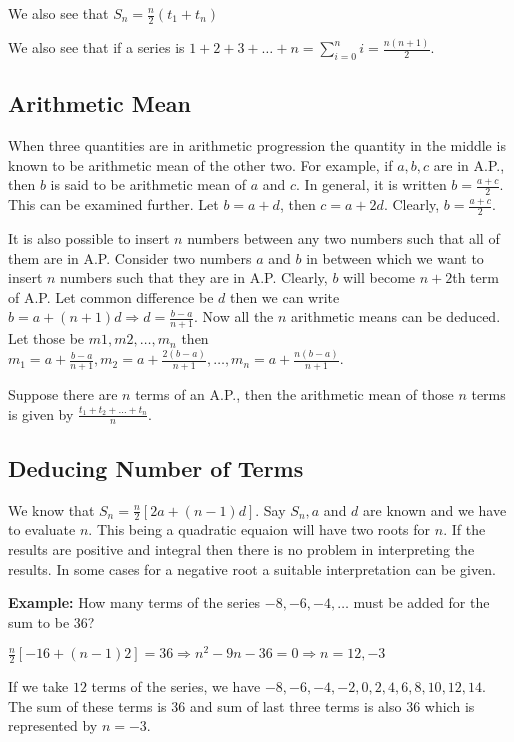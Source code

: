 We also see that $S_n = \frac{n}{2}(t_1 + t_n)$

We also see that if a series is $1 + 2 + 3 + \ldots + n = \sum_{i=0}^ni = \frac{n(n + 1)}{2}$.

\subsection{Arithmetic Mean}
When three quantities are in arithmetic progression the quantity in the middle is known to be arithmetic mean of the other two. For
example, if $a, b, c$ are in A.P., then $b$ is said to be arithmetic mean of $a$ and $c$. In general, it is written $b = \frac{a +
  c}{2}$. This can be examined further. Let $b = a + d$, then $c = a + 2d$. Clearly, $b = \frac{a + c}{2}$.

It is also possible to insert $n$ numbers between any two numbers such that all of them are in A.P. Consider two numbers $a$ and
$b$ in between which we want to insert $n$ numbers such that they are in A.P. Clearly, $b$ will become $n +2$th term of A.P. Let
common difference be $d$ then we can write $b = a + (n + 1)d \Rightarrow d = \frac{b - a}{n + 1}$. Now all the $n$ arithmetic means
can be deduced. Let those be $m1, m2, \ldots, m_n$ then $m_1 = a + \frac{b - a}{n + 1}, m_2 = a + \frac{2(b - a)}{n + 1}, \ldots,
m_n = a + \frac{n(b - a)}{n + 1}$.

Suppose there are $n$ terms of an A.P., then the arithmetic mean of those $n$ terms is given by $\frac{t_1 + t_2 + \ldots +
  t_n}{n}$.

\subsection{Deducing Number of Terms}
We know that $S_n = \frac{n}{2}[2a + (n - 1)d]$. Say $S_n, a$ and $d$ are known and we have to evaluate $n$. This being a quadratic
equaion will have two roots for $n$. If the results are positive and integral then there is no problem in interpreting the
results. In some cases for a negative root a suitable interpretation can be given.

\textbf{Example:} How many terms of the series $-8, -6, -4, \ldots$ must be added for the sum to be $36$?

$\frac{n}{2}[-16 + (n - 1)2] = 36\Rightarrow n^2 - 9n - 36 = 0 \Rightarrow n = 12, -3$

If we take $12$ terms of the series, we have $-8, -6, -4, -2, 0, 2, 4, 6, 8, 10, 12, 14$. The sum of these terms is $36$ and sum of
last three terms is also $36$ which is represented by $n = -3$.


